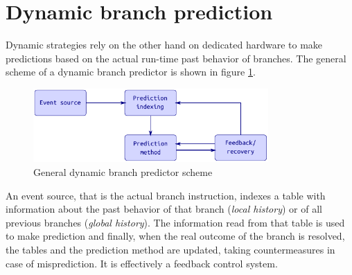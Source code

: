 \section{Dynamic branch prediction}\label{sec:dynbp}
Dynamic strategies rely on the other hand on dedicated hardware to make predictions based on the actual run-time past behavior of branches. The general scheme of a dynamic branch predictor is shown in figure \ref{fig:bpfeedback}.
\begin{figure}[hbtp]
  \centering
  \includegraphics[width=0.8\textwidth]{img/bpfeedback.pdf}
  \caption{General dynamic branch predictor scheme}
  \label{fig:bpfeedback}
\end{figure}
An event source, that is the actual branch instruction, indexes a table with information about the past behavior of that branch (\emph{local history}) or of all previous branches (\emph{global history}). The information read from that table is used to make prediction and finally, when the real outcome of the branch is resolved, the tables and the prediction method are updated, taking countermeasures in case of misprediction. It is effectively a feedback control system.

